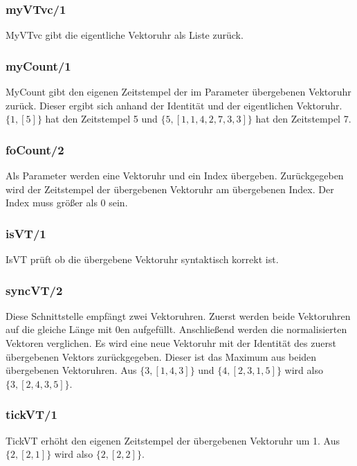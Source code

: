 \subsubsection{myVTvc/1}

MyVTvc gibt die eigentliche Vektoruhr als Liste zurück.

\subsubsection{myCount/1}

MyCount gibt den eigenen Zeitstempel der im Parameter übergebenen Vektoruhr zurück. Dieser ergibt sich anhand der Identität und der eigentlichen Vektoruhr. $\{1, [5]\}$ hat den Zeitstempel 5 und $\{5, [1,1,4,2,7,3,3]\}$ hat den Zeitstempel 7.

\subsubsection{foCount/2}

Als Parameter werden eine Vektoruhr und ein Index übergeben. Zurückgegeben wird der Zeitstempel der übergebenen Vektoruhr am übergebenen Index. Der Index muss größer als 0 sein.

\subsubsection{isVT/1}

IsVT prüft ob die übergebene Vektoruhr syntaktisch korrekt ist.

\subsubsection{syncVT/2}

Diese Schnittstelle empfängt zwei Vektoruhren. Zuerst werden beide Vektoruhren auf die gleiche Länge mit 0en aufgefüllt. Anschließend werden die normalisierten Vektoren verglichen. Es wird eine neue Vektoruhr mit der Identität des zuerst übergebenen Vektors zurückgegeben. Dieser ist das Maximum aus beiden übergebenen Vektoruhren. Aus $\{3, [1,4,3]\}$ und $\{4, [2,3,1,5]\}$ wird also $\{3, [2,4,3,5]\}$. 

\subsubsection{tickVT/1}

TickVT erhöht den eigenen Zeitstempel der übergebenen Vektoruhr um 1. Aus $\{2, [2,1]\}$ wird also $\{2, [2,2]\}$.

